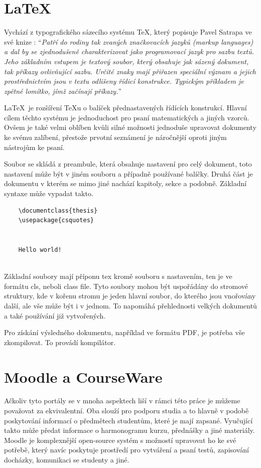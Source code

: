  \section{LaTeX} 
	Vychází z typografického sázecího systému \TeX, který popisuje Pavel Satrapa ve své knize \cite{latex}: \enquote{\textit{Patří do rodiny tak zvaných značkovacích jazyků (markup languages) a dal by se zjednodušeně charakterizovat jako programovací jazyk pro sazbu textů. Jeho základním vstupem je textový soubor, který obsahuje jak sázený dokument, tak příkazy ovlivňující sazbu. Určité znaky mají přiřazen speciální význam a jejich prostřednictvím jsou v textu odlišeny řídicí konstrukce. Typickým příkladem je zpětné lomítko, jímž začínají příkazy.}}
	
	\LaTeX\ je rozšíření \TeX u o balíček přednastavených řídících konstrukcí. Hlavní cílem těchto systému je jednoduchost pro psaní matematických a jiných vzorců. Ovšem je také velmi oblíben kvůli silné možnosti jednoduše upravovat dokumenty ke svému zalíbení, přestože prvotní seznámení je náročnější oproti jiným nástrojům ke psaní.
	
	Soubor se skládá z preambule, která obsahuje nastavení pro celý dokument, toto nastavení může být v jiném souboru a případně používané balíčky. Druhá část je dokumentu v kterém se mimo jiné nachází kapitoly, sekce a podobně. Základní syntaxe může vypadat takto.
	\begin{verbatim}
	\documentclass{thesis}
	\usepackage{csquotes}
	
	
	Hello world!
	
	\end{verbatim}
	
	Základní soubory mají příponu tex kromě souboru s nastavením, ten je ve formátu cls, neboli class file. Tyto soubory mohou být uspořádány do stromové struktury, kde v kořenu stromu je jeden hlavní soubor, do kterého jsou vnořovány další, ale vše může být i v jednom. To napomáhá přehlednosti velkých dokumentů a také používání již vytvořených. 
	
	Pro získání výsledného dokumentu, například ve formátu PDF, je potřeba vše zkompilovat. To provádí kompilátor.  

\section{Moodle a CourseWare}
	Ačkoliv tyto portály se v mnoha aspektech liší v rámci této práce je můžeme považovat za ekvivalentní. Oba slouží pro podporu studia a to hlavně v podobě poskytování informací o předmětech studentům, které je mají zapsané. Vyučující takto může předat informace o harmonogramu kurzu, přednášky a jiné materiály. Moodle je komplexnější open-source systém s možností upravovat ho ke své potřebě, který navíc poskytuje prostředí pro vytváření a psaní testů, zapisování docházky, komunikaci se studenty a jiné.

